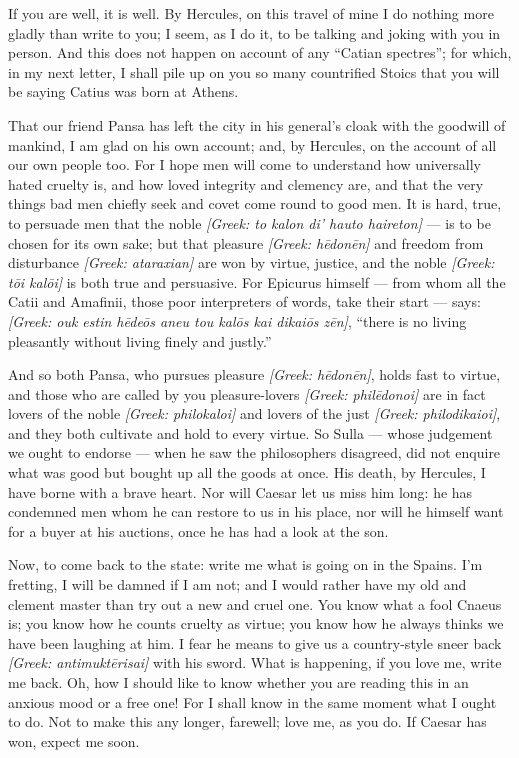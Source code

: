 

 If you are well, it is well. By Hercules, on this travel of mine I do nothing more gladly than write to you; I seem, as I do it, to be talking and joking with you in person. And this does not happen on account of any ``Catian spectres''; for which, in my next letter, I shall pile up on you so many countrified Stoics that you will be saying Catius was born at Athens.

 That our friend Pansa has left the city in his general's cloak with the goodwill of mankind, I am glad on his own account; and, by Hercules, on the account of all our own people too. For I hope men will come to understand how universally hated cruelty is, and how loved integrity and clemency are, and that the very things bad men chiefly seek and covet come round to good men. It is hard, true, to persuade men that the noble \textit{[Greek: to kalon di' hauto haireton]} --- is to be chosen for its own sake; but that pleasure \textit{[Greek: hēdonēn]} and freedom from disturbance \textit{[Greek: ataraxian]} are won by virtue, justice, and the noble \textit{[Greek: tōi kalōi]} is both true and persuasive. For Epicurus himself --- from whom all the Catii and Amafinii, those poor interpreters of words, take their start --- says: \textit{[Greek: ouk estin hēdeōs aneu tou kalōs kai dikaiōs zēn]}, ``there is no living pleasantly without living finely and justly.''

 And so both Pansa, who pursues pleasure \textit{[Greek: hēdonēn]}, holds fast to virtue, and those who are called by you pleasure-lovers \textit{[Greek: philēdonoi]} are in fact lovers of the noble \textit{[Greek: philokaloi]} and lovers of the just \textit{[Greek: philodikaioi]}, and they both cultivate and hold to every virtue. So Sulla --- whose judgement we ought to endorse --- when he saw the philosophers disagreed, did not enquire what was good but bought up all the goods at once. His death, by Hercules, I have borne with a brave heart. Nor will Caesar let us miss him long: he has condemned men whom he can restore to us in his place, nor will he himself want for a buyer at his auctions, once he has had a look at the son.

 Now, to come back to the state: write me what is going on in the Spains. I'm fretting, I will be damned if I am not; and I would rather have my old and clement master than try out a new and cruel one. You know what a fool Cnaeus is; you know how he counts cruelty as virtue; you know how he always thinks we have been laughing at him. I fear he means to give us a country-style sneer back \textit{[Greek: antimuktērisai]} with his sword. What is happening, if you love me, write me back. Oh, how I should like to know whether you are reading this in an anxious mood or a free one! For I shall know in the same moment what I ought to do. Not to make this any longer, farewell; love me, as you do. If Caesar has won, expect me soon.
